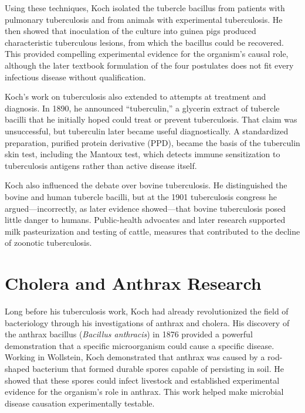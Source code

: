 Using these techniques, Koch isolated the tubercle bacillus from patients with pulmonary tuberculosis and from animals with experimental tuberculosis. He then showed that inoculation of the culture into guinea pigs produced characteristic tuberculous lesions, from which the bacillus could be recovered. This provided compelling experimental evidence for the organism's causal role, although the later textbook formulation of the four postulates does not fit every infectious disease without qualification.

Koch's work on tuberculosis also extended to attempts at treatment and diagnosis. In 1890, he announced ``tuberculin,'' a glycerin extract of tubercle bacilli that he initially hoped could treat or prevent tuberculosis. That claim was unsuccessful, but tuberculin later became useful diagnostically. A standardized preparation, purified protein derivative (PPD), became the basis of the tuberculin skin test, including the Mantoux test, which detects immune sensitization to tuberculosis antigens rather than active disease itself.

Koch also influenced the debate over bovine tuberculosis. He distinguished the bovine and human tubercle bacilli, but at the 1901 tuberculosis congress he argued---incorrectly, as later evidence showed---that bovine tuberculosis posed little danger to humans. Public-health advocates and later research supported milk pasteurization and testing of cattle, measures that contributed to the decline of zoonotic tuberculosis.\cite{bovine-tb-history}

\section{Cholera and Anthrax Research}

Long before his tuberculosis work, Koch had already revolutionized the field of bacteriology through his investigations of anthrax and cholera. His discovery of the anthrax bacillus (\emph{Bacillus anthracis}) in 1876 provided a powerful demonstration that a specific microorganism could cause a specific disease. Working in Wollstein, Koch demonstrated that anthrax was caused by a rod-shaped bacterium that formed durable spores capable of persisting in soil. He showed that these spores could infect livestock and established experimental evidence for the organism's role in anthrax. This work helped make microbial disease causation experimentally testable.

